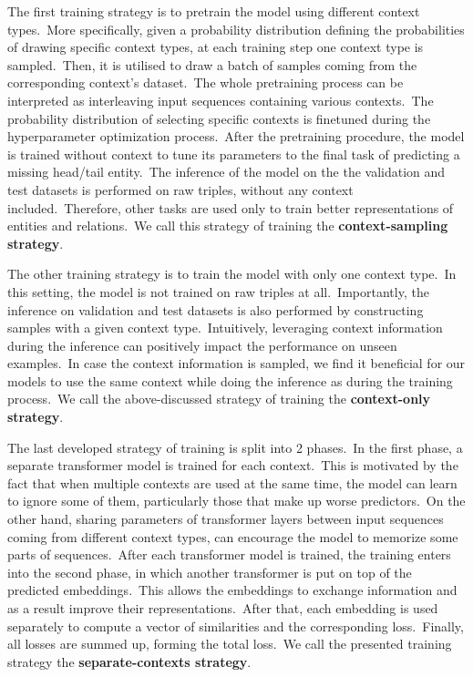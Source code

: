 \documentclass[longabstract, english, mgr]{iithesis}
\theoremstyle{default_theorem_style}\newtheorem{theorem}{Theorem}
\theoremstyle{default_theorem_style}\newtheorem{definition}{Definition}
\begin{document}
\noindent The first training strategy is to pretrain the model using different context types.\ More specifically,
given a probability distribution defining the probabilities of drawing specific context types, at each training step
one context type is sampled.\ Then, it is utilised to draw a batch of samples coming from the corresponding context's
dataset.\ The whole pretraining process can be interpreted as interleaving input sequences containing various
contexts.\ The probability distribution of selecting specific contexts is finetuned during the hyperparameter
optimization process.\ After the pretraining procedure, the model is trained without context to tune its parameters
to the final task of predicting a missing head/tail entity.\ The inference of the model on the the validation and test
datasets is performed on raw triples, without any context included.\ Therefore, other tasks are used only to train
better representations of entities and relations.\ We call this strategy of training the
\textbf{context-sampling strategy}.\newline

\noindent The other training strategy is to train the model with only one context type.\ In this setting, the model
is not trained on raw triples at all.\ Importantly, the inference on validation and test datasets is also performed by
constructing samples with a given context type.\ Intuitively, leveraging context information during the inference
can positively impact the performance on unseen examples.\ In case the context information is sampled, we find it
beneficial for our models to use the same context while doing the inference as during the training
process.\ We call the above-discussed strategy of training the \textbf{context-only strategy}.\newline

\noindent The last developed strategy of training is split into 2 phases.\ In the first phase, a separate transformer
model is trained for each context.\ This is motivated by the fact that when multiple contexts are used at the same
time, the model can learn to ignore some of them, particularly those that make up worse predictors.\ On the other
hand, sharing parameters of transformer layers between input sequences coming from different context types, can
encourage the model to memorize some parts of sequences.\ After each transformer model is trained, the training enters
into the second phase, in which another transformer is put on top of the predicted embeddings.\ This allows the
embeddings to exchange information and as a result improve their representations.\ After that, each embedding is used
separately to compute a vector of similarities and the corresponding loss.\ Finally, all losses are summed up,
forming the total loss.\ We call the presented training strategy the \textbf{separate-contexts strategy}.
\end{document}
